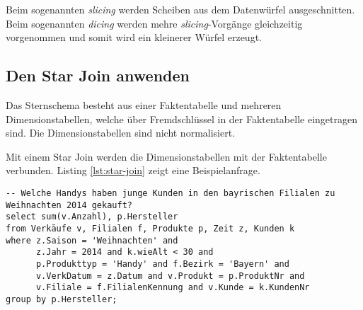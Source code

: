 Beim sogenannten \emph{slicing} werden Scheiben aus dem Datenwürfel ausgeschnitten. Beim sogenannten \emph{dicing} werden mehre \emph{slicing}-Vorgänge gleichzeitig vorgenommen und somit wird ein kleinerer Würfel erzeugt.

\subsection{Den Star Join anwenden}

Das Sternschema besteht aus einer Faktentabelle und mehreren Dimensionstabellen, welche über Fremdschlüssel in der Faktentabelle eingetragen sind. Die Dimensionstabellen sind nicht normalisiert.

Mit einem Star Join werden die Dimensionstabellen mit der Faktentabelle verbunden. Listing \ref{lst:star-join} zeigt eine Beispielanfrage.

\begin{lstlisting}[caption={Star Join},label=lst:star-join]
-- Welche Handys haben junge Kunden in den bayrischen Filialen zu Weihnachten 2014 gekauft?
select sum(v.Anzahl), p.Hersteller
from Verkäufe v, Filialen f, Produkte p, Zeit z, Kunden k
where z.Saison = 'Weihnachten' and
	  z.Jahr = 2014 and k.wieAlt < 30 and
	  p.Produkttyp = 'Handy' and f.Bezirk = 'Bayern' and
	  v.VerkDatum = z.Datum and v.Produkt = p.ProduktNr and
	  v.Filiale = f.FilialenKennung and v.Kunde = k.KundenNr
group by p.Hersteller;
\end{lstlisting}